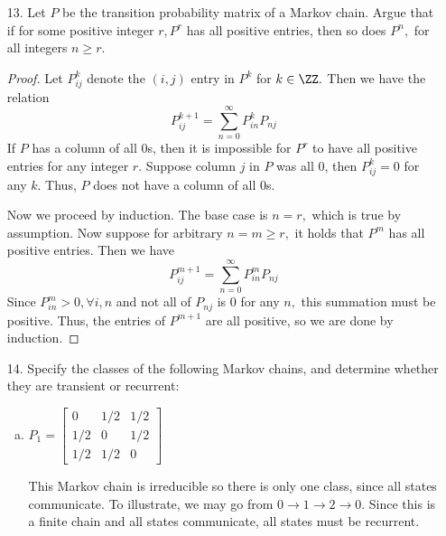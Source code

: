 \documentclass{article}
\begin{document}
\begin{itemize}
\begin{proof}
\begin{align*}
				&= \frac{p}{2} + \frac{p}{2}(2p-1)^k + \frac{1}{2} - \frac{1}{2}(2p-1)^k - \frac{p}{2} + \frac{p}{2}(2p-1)^k \\
				&= \frac{1}{2} + \left( p-\frac{1}{2} \right)(2p-1)^k = \frac{1}{2} + \frac{1}{2}(2p-1)^{k+1} \\
				P_{01}=P_{10} &= (1-p)\left( \frac{1}{2}+\frac{1}{2}(2p-1)^k \right) + p\left( \frac{1}{2}-\frac{1}{2}(2p-1)^k \right) \\
				&= \frac{1}{2}+\frac{1}{2}(2p-1)^k - \frac{p}{2} + \frac{p}{2}(2p-1)^k + \frac{p}{2} - \frac{p}{2}(2p-1)^k \\
				&= \frac{1}{2} - \left( p-\frac{1}{2} \right)(2p-1)^k = \frac{1}{2}-\frac{1}{2}(2p-1)^{k+1}
			\end{align*}
			so the formula holds for $k+1,$ and the statement is proven.
		\end{proof}

	\item[13.] Let $P$ be the transition probability matrix of a Markov chain. Argue that if for some positive integer $r, P^r$ has all positive entries, then so does $P^n,$ for all integers $n\ge r.$
		\begin{proof}
			Let $P_{ij}^k$ denote the $(i, j)$ entry in $P^k$ for $k\in\ZZ.$ Then we have the relation
			\[P^{k+1}_{ij} = \sum_{n=0}^{\infty}P^{k}_{in}P_{nj}\]
			If $P$ has a column of all 0s, then it is impossible for $P^r$ to have all positive entries for any integer $r.$ Suppose column $j$ in $P$ was all 0, then $P_{ij}^k=0$ for any $k.$ Thus, $P$ does not have a column of all 0s.

			Now we proceed by induction. The base case is $n=r,$ which is true by assumption. Now suppose for arbitrary $n=m\ge r,$ it holds that $P^m$ has all positive entries. Then we have
			\[P^{m+1}_{ij} = \sum_{n=0}^{\infty}P^m_{in}P_{nj}\]
			Since $P^m_{in}>0, \forall i, n$ and not all of $P_{nj}$ is 0 for any $n,$ this summation must be positive. Thus, the entries of $P^{m+1}$ are all positive, so we are done by induction.
		\end{proof}

	\item[14.] Specify the classes of the following Markov chains, and determine whether they are transient or recurrent:
		\begin{enumerate}[(a)]
			\item $P_1=\begin{bmatrix}
					0 & 1/2 & 1/2 \\ 1/2 & 0 & 1/2 \\ 1/2 & 1/2 & 0
				\end{bmatrix}$
				\begin{soln}
					This Markov chain is irreducible so there is only one class, since all states communicate. To illustrate, we may go from $0\to1\to2\to0.$ Since this is a finite chain and all states communicate, all states must be recurrent.
				\end{soln}


\end{enumerate}
\end{itemize}
\end{document}
